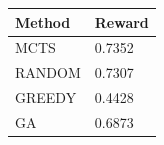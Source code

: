 \begin{tabular}{ll}
\hline
Method & Reward \\
\hline
  MCTS & 0.7352 \\
  RANDOM & 0.7307 \\
  GREEDY & 0.4428 \\
  GA & 0.6873 \\
\hline
\end{tabular}
